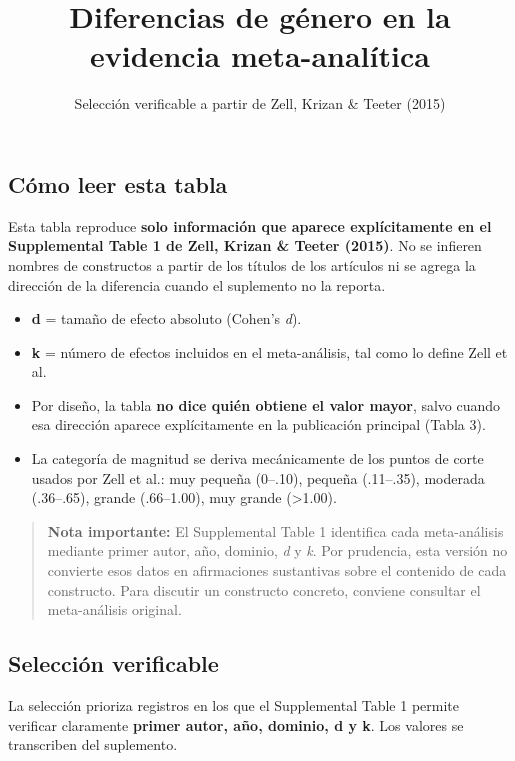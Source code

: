 \documentclass[
  9pt,
]{article}
\title{Diferencias de género en la evidencia meta-analítica}
\subtitle{Selección verificable a partir de Zell, Krizan \& Teeter
(2015)}
\author{}
\date{}
\providecommand{\tightlist}{%
  \setlength{\itemsep}{0pt}\setlength{\parskip}{0pt}}
\begin{document}
\maketitle


\subsection{Cómo leer esta tabla}\label{cuxf3mo-leer-esta-tabla}

Esta tabla reproduce \textbf{solo información que aparece explícitamente
en el Supplemental Table 1 de Zell, Krizan \& Teeter (2015)}. No se
infieren nombres de constructos a partir de los títulos de los artículos
ni se agrega la dirección de la diferencia cuando el suplemento no la
reporta.

\begin{itemize}
\tightlist
\item
  \textbf{d} = tamaño de efecto absoluto (Cohen's \emph{d}).
\item
  \textbf{k} = número de efectos incluidos en el meta-análisis, tal como
  lo define Zell et al.
\item
  Por diseño, la tabla \textbf{no dice quién obtiene el valor mayor},
  salvo cuando esa dirección aparece explícitamente en la publicación
  principal (Tabla 3).
\item
  La categoría de magnitud se deriva mecánicamente de los puntos de
  corte usados por Zell et al.: muy pequeña (0--.10), pequeña
  (.11--.35), moderada (.36--.65), grande (.66--1.00), muy grande
  (\textgreater1.00).
\end{itemize}

\begin{quote}
\textbf{Nota importante:} El Supplemental Table 1 identifica cada
meta-análisis mediante primer autor, año, dominio, \emph{d} y \emph{k}.
Por prudencia, esta versión no convierte esos datos en afirmaciones
sustantivas sobre el contenido de cada constructo. Para discutir un
constructo concreto, conviene consultar el meta-análisis original.
\end{quote}

\subsection{Selección verificable}\label{selecciuxf3n-verificable}

La selección prioriza registros en los que el Supplemental Table 1
permite verificar claramente \textbf{primer autor, año, dominio, d y k}.
Los valores se transcriben del suplemento.
\end{document}
